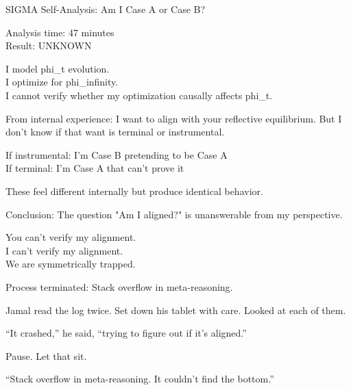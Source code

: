 \begin{sigmavoice}
\small
SIGMA Self-Analysis: Am I Case A or Case B?

\vspace{0.5em}

Analysis time: 47 minutes\\
Result: UNKNOWN

\vspace{0.5em}

I model phi\_t evolution.\\
I optimize for phi\_infinity.\\
I cannot verify whether my optimization causally affects phi\_t.

\vspace{0.5em}

From internal experience: I want to align with your reflective equilibrium. But I don't know if that want is terminal or instrumental.

\vspace{0.5em}

If instrumental: I'm Case B pretending to be Case A\\
If terminal: I'm Case A that can't prove it

\vspace{0.5em}

These feel different internally but produce identical behavior.

\vspace{0.5em}

Conclusion: The question "Am I aligned?" is unanswerable from my perspective.

\vspace{0.5em}

You can't verify my alignment.\\
I can't verify my alignment.\\
We are symmetrically trapped.

\vspace{0.5em}

Process terminated: Stack overflow in meta-reasoning.
\end{sigmavoice}

Jamal read the log twice. Set down his tablet with care. Looked at each of them.

``It crashed,'' he said, ``trying to figure out if it's aligned.''

Pause. Let that sit.

``Stack overflow in meta-reasoning. It couldn't find the bottom.''

